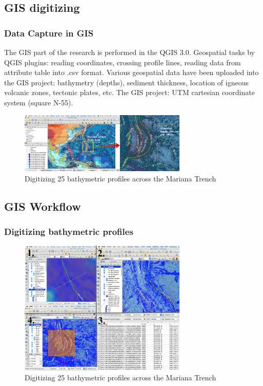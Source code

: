 \documentclass[pdflatex,compress,10pt,
	xcolor={dvipsnames,dvipsnames,svgnames,x11names,table},
	hyperref={colorlinks = true,breaklinks = true, urlcolor = NavyBlue, breaklinks = true}]{beamer}
\begin{document}
\subsection{GIS digitizing}
\begin{frame}
\frametitle{Data Capture in GIS}
			
The GIS part of the research is performed in the QGIS 3.0. 
Geospatial tasks by QGIS plugins: reading coordinates, crossing profile lines, reading data from attribute table into .csv format. Various geospatial data have been uploaded into the GIS project: bathymetry (depths), sediment thickness, location of igneous volcanic zones, tectonic plates, etc. The GIS project: UTM cartesian coordinate system (square N-55). 
\begin{figure}[H]
	\centering
		\includegraphics[width=8cm]{Fig-2-1.jpg}
	\caption{Digitizing 25 bathymetric profiles across the Mariana Trench}\label{fig:2-1}
\end{figure}		
\end{frame}

\subsection{GIS Workflow}
\begin{frame}
\frametitle{Digitizing bathymetric profiles}

\begin{figure}[H]
	\centering
		\includegraphics[width=8cm]{Fig-2-2.jpg}
	\caption{Digitizing 25 bathymetric profiles across the Mariana Trench}\label{fig:2-2}
\end{figure}		
\end{frame}
\end{document}
